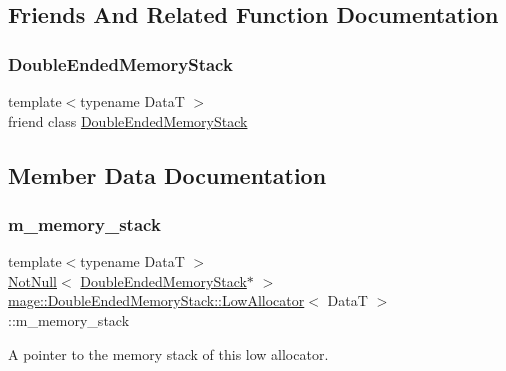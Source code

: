 \subsection{Friends And Related Function Documentation}
\hypertarget{classmage_1_1_double_ended_memory_stack_1_1_low_allocator_a10ae729d55b8c0017057250445835680}{}\label{classmage_1_1_double_ended_memory_stack_1_1_low_allocator_a10ae729d55b8c0017057250445835680} 
\subsubsection{\texorpdfstring{Double\+Ended\+Memory\+Stack}{DoubleEndedMemoryStack}}
{\footnotesize\ttfamily template$<$typename DataT $>$ \\
friend class \hyperlink{classmage_1_1_double_ended_memory_stack}{Double\+Ended\+Memory\+Stack}\hspace{0.3cm}{\ttfamily [friend]}}



\subsection{Member Data Documentation}
\hypertarget{classmage_1_1_double_ended_memory_stack_1_1_low_allocator_a96d9553c3c37445cc1e8b15399784a1b}{}\label{classmage_1_1_double_ended_memory_stack_1_1_low_allocator_a96d9553c3c37445cc1e8b15399784a1b} 
\subsubsection{\texorpdfstring{m\+\_\+memory\+\_\+stack}{m\_memory\_stack}}
{\footnotesize\ttfamily template$<$typename DataT $>$ \\
\hyperlink{namespacemage_a8769f9d670d6b585ea306cb1062af94b}{Not\+Null}$<$ \hyperlink{classmage_1_1_double_ended_memory_stack}{Double\+Ended\+Memory\+Stack}$\ast$ $>$ \hyperlink{classmage_1_1_double_ended_memory_stack_1_1_low_allocator}{mage\+::\+Double\+Ended\+Memory\+Stack\+::\+Low\+Allocator}$<$ DataT $>$\+::m\+\_\+memory\+\_\+stack\hspace{0.3cm}{\ttfamily [private]}}

A pointer to the memory stack of this low allocator. 